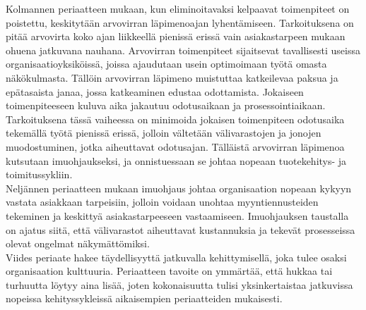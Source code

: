 \documentclass[finnish,12pt,a4paper,pdftex]{article}
\begin{document}
\noindent Kolmannen periaatteen mukaan, kun eliminoitavaksi kelpaavat toimenpiteet on poistettu, keskitytään arvovirran läpimenoajan lyhentämiseen. Tarkoituksena on pitää arvovirta koko ajan liikkeellä pienissä erissä vain asiakastarpeen mukaan ohuena jatkuvana nauhana. Arvovirran toimenpiteet sijaitsevat tavallisesti useissa organisaatioyksiköissä, joissa ajaudutaan usein optimoimaan työtä omasta näkökulmasta. Tällöin arvovirran läpimeno muistuttaa katkeilevaa paksua ja epätasaista janaa, jossa katkeaminen edustaa odottamista. Jokaiseen toimenpiteeseen kuluva aika jakautuu odotusaikaan ja prosessointiaikaan. Tarkoituksena tässä vaiheessa on minimoida jokaisen toimenpiteen odotusaika tekemällä työtä pienissä erissä, jolloin vältetään välivarastojen ja jonojen muodostuminen, jotka aiheuttavat odotusajan. Tälläistä arvovirran läpimenoa kutsutaan imuohjaukseksi, ja onnistuessaan se johtaa nopeaan tuotekehitys- ja toimitussykliin.\\

\noindent Neljännen periaatteen mukaan imuohjaus johtaa organisaation nopeaan kykyyn vastata asiakkaan tarpeisiin, jolloin voidaan unohtaa myyntiennusteiden tekeminen ja keskittyä asiakastarpeeseen vastaamiseen. Imuohjauksen taustalla on ajatus siitä, että välivarastot aiheuttavat kustannuksia ja tekevät prosesseissa olevat ongelmat näkymättömiksi.\\

\noindent Viides periaate hakee täydellisyyttä jatkuvalla kehittymisellä, joka tulee osaksi organisaation kulttuuria. Periaatteen tavoite on ymmärtää, että hukkaa tai turhuutta löytyy aina lisää, joten kokonaisuutta tulisi yksinkertaistaa jatkuvissa nopeissa kehityssykleissä aikaisempien periaatteiden mukaisesti.\\


\end{document}
